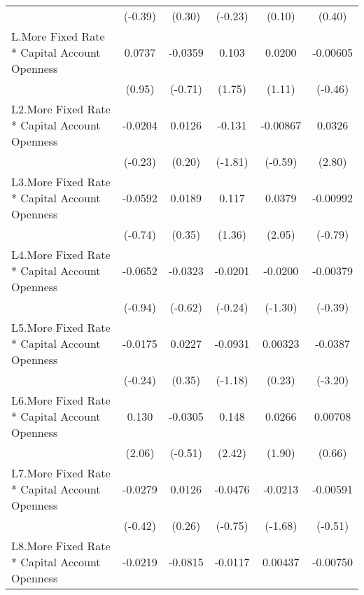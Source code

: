 {\begin{tabular}{l*{5}{c}}
                &  (-0.39)         &   (0.30)         &  (-0.23)         &   (0.10)         &   (0.40)         \\
[1em]
L.More Fixed Rate * Capital Account Openness&   0.0737         &  -0.0359         &    0.103         &   0.0200         & -0.00605         \\
                &   (0.95)         &  (-0.71)         &   (1.75)         &   (1.11)         &  (-0.46)         \\
[1em]
L2.More Fixed Rate * Capital Account Openness&  -0.0204         &   0.0126         &   -0.131         & -0.00867         &   0.0326\sym{**} \\
                &  (-0.23)         &   (0.20)         &  (-1.81)         &  (-0.59)         &   (2.80)         \\
[1em]
L3.More Fixed Rate * Capital Account Openness&  -0.0592         &   0.0189         &    0.117         &   0.0379\sym{*}  & -0.00992         \\
                &  (-0.74)         &   (0.35)         &   (1.36)         &   (2.05)         &  (-0.79)         \\
[1em]
L4.More Fixed Rate * Capital Account Openness&  -0.0652         &  -0.0323         &  -0.0201         &  -0.0200         & -0.00379         \\
                &  (-0.94)         &  (-0.62)         &  (-0.24)         &  (-1.30)         &  (-0.39)         \\
[1em]
L5.More Fixed Rate * Capital Account Openness&  -0.0175         &   0.0227         &  -0.0931         &  0.00323         &  -0.0387\sym{**} \\
                &  (-0.24)         &   (0.35)         &  (-1.18)         &   (0.23)         &  (-3.20)         \\
[1em]
L6.More Fixed Rate * Capital Account Openness&    0.130\sym{*}  &  -0.0305         &    0.148\sym{*}  &   0.0266         &  0.00708         \\
                &   (2.06)         &  (-0.51)         &   (2.42)         &   (1.90)         &   (0.66)         \\
[1em]
L7.More Fixed Rate * Capital Account Openness&  -0.0279         &   0.0126         &  -0.0476         &  -0.0213         & -0.00591         \\
                &  (-0.42)         &   (0.26)         &  (-0.75)         &  (-1.68)         &  (-0.51)         \\
[1em]
L8.More Fixed Rate * Capital Account Openness&  -0.0219         &  -0.0815\sym{*}  &  -0.0117         &  0.00437         & -0.00750         \\

\end{tabular}}
